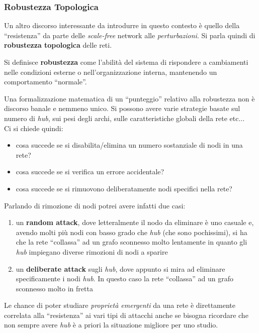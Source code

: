 \documentclass[a4paper,12pt, oneside]{book}
\begin{document}
\subsubsection{Robustezza Topologica}
Un altro discorso interessante da introdurre in questo contesto è quello della
``resistenza'' da parte delle \textit{scale-free} network alle
\textit{perturbazioni}. Si parla quindi di \textbf{robustezza topologica} delle
reti. 
\begin{definizione}
  Si definisce \textbf{robustezza} come l'abilità del sistema di rispondere a
  cambiamenti nelle condizioni esterne o nell'organizzazione interna, mantenendo
  un comportamento ``normale''.
\end{definizione}
Una formalizzazione matematica di un ``punteggio'' relativo alla robustezza non
è discorso banale e nemmeno unico. Si possono avere varie strategie basate sul
numero di \textit{hub}, sui pesi degli archi, sulle caratteristiche globali
della rete etc$\ldots$\\
Ci si chiede quindi:
\begin{itemize}
  \item cosa succede se si disabilita/elimina un numero sostanziale di nodi in
  una rete? 
  \item cosa succede se si verifica un errore accidentale?
  \item cosa succede se si rimuovono deliberatamente nodi specifici nella rete? 
\end{itemize}
Parlando di rimozione di nodi potrei avere infatti due casi:
\begin{enumerate}
  \item un \textbf{random attack}, dove letteralmente il nodo da eliminare è uno
  casuale e, avendo molti più nodi con basso grado che \textit{hub} (che sono
  pochissimi), si ha che la rete ``collassa'' ad un grafo sconnesso molto
  lentamente in quanto gli \textit{hub} impiegano diverse rimozioni di nodi a
  sparire 
  \item un \textbf{deliberate attack} sugli \textit{hub}, dove appunto si mira
  ad eliminare specificamente i nodi \textit{hub}. In questo caso la rete
  ``collassa'' ad un grafo sconnesso molto in fretta
\end{enumerate}
Le chance di poter studiare \textit{proprietà emergenti} da una rete è
direttamente correlata alla ``resistenza'' ai vari tipi di attacchi anche se
bisogna ricordare che non sempre avere \textit{hub} è a priori la situazione
migliore per uno studio.
\end{document}

